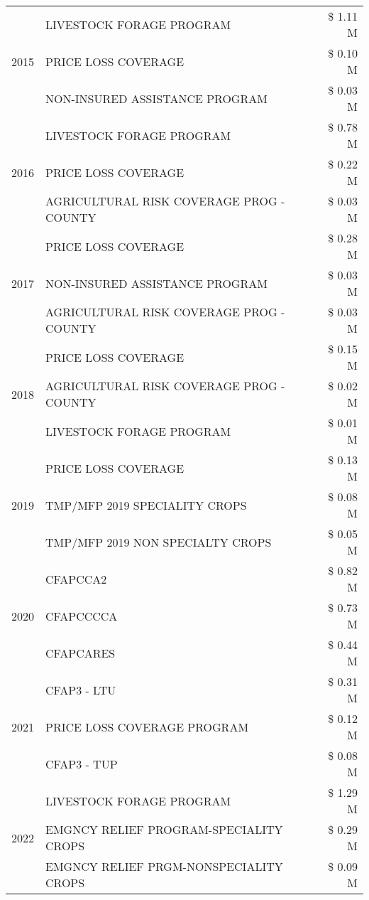 \begin{tabular}{llr}
\cline{1-3}
\multirow[t]{3}{*}{2015} & LIVESTOCK FORAGE PROGRAM & \$ 1.11 M \\
 & PRICE LOSS COVERAGE & \$ 0.10 M \\
 & NON-INSURED ASSISTANCE PROGRAM & \$ 0.03 M \\
\cline{1-3}
\multirow[t]{3}{*}{2016} & LIVESTOCK FORAGE PROGRAM & \$ 0.78 M \\
 & PRICE LOSS COVERAGE & \$ 0.22 M \\
 & AGRICULTURAL RISK COVERAGE PROG - COUNTY & \$ 0.03 M \\
\cline{1-3}
\multirow[t]{3}{*}{2017} & PRICE LOSS COVERAGE & \$ 0.28 M \\
 & NON-INSURED ASSISTANCE PROGRAM & \$ 0.03 M \\
 & AGRICULTURAL RISK COVERAGE PROG - COUNTY & \$ 0.03 M \\
\cline{1-3}
\multirow[t]{3}{*}{2018} & PRICE LOSS COVERAGE & \$ 0.15 M \\
 & AGRICULTURAL RISK COVERAGE PROG - COUNTY & \$ 0.02 M \\
 & LIVESTOCK FORAGE PROGRAM & \$ 0.01 M \\
\cline{1-3}
\multirow[t]{3}{*}{2019} & PRICE LOSS COVERAGE & \$ 0.13 M \\
 & TMP/MFP 2019 SPECIALITY CROPS & \$ 0.08 M \\
 & TMP/MFP 2019 NON SPECIALTY CROPS & \$ 0.05 M \\
\cline{1-3}
\multirow[t]{3}{*}{2020} & CFAPCCA2 & \$ 0.82 M \\
 & CFAPCCCCA & \$ 0.73 M \\
 & CFAPCARES & \$ 0.44 M \\
\cline{1-3}
\multirow[t]{3}{*}{2021} & CFAP3 - LTU & \$ 0.31 M \\
 & PRICE LOSS COVERAGE PROGRAM & \$ 0.12 M \\
 & CFAP3 - TUP & \$ 0.08 M \\
\cline{1-3}
\multirow[t]{3}{*}{2022} & LIVESTOCK FORAGE PROGRAM & \$ 1.29 M \\
 & EMGNCY RELIEF PROGRAM-SPECIALITY CROPS & \$ 0.29 M \\
 & EMGNCY RELIEF PRGM-NONSPECIALITY CROPS & \$ 0.09 M \\
\cline{1-3}
\bottomrule
\end{tabular}
